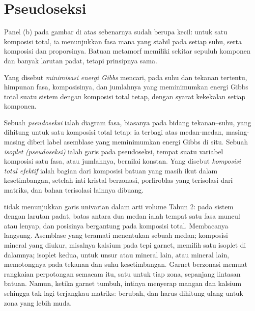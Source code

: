 \section{Pseudoseksi}\label{sec:b3:petrological-thermodynamics:pseudosections}

Panel (b) pada gambar di atas sebenarnya sudah berupa  kecil: untuk satu
komposisi total, ia menunjukkan fasa mana yang stabil pada setiap suhu, serta
komposisi dan proporsinya. Batuan metamorf memiliki sekitar sepuluh
komponen dan banyak larutan padat, tetapi prinsipnya sama.

\begin{definition}\label{def:b3:petrological-thermodynamics:minimisation}
Yang disebut \emph{minimisasi energi Gibbs} mencari, pada suhu dan
tekanan tertentu, himpunan fasa, komposisinya, dan
jumlahnya yang meminimumkan energi Gibbs total suatu sistem dengan komposisi total
tetap, dengan syarat kekekalan setiap komponen.
\end{definition}

\begin{definition}\label{def:b3:petrological-thermodynamics:pseudosection}
Sebuah \emph{pseudoseksi} ialah diagram fasa, biasanya pada bidang
tekanan--suhu, yang dihitung untuk satu komposisi total tetap: ia
terbagi atas medan-medan, masing-masing diberi label asemblase yang meminimumkan
energi Gibbs di situ. Sebuah \emph{isoplet (pseudoseksi)}
ialah garis pada pseudoseksi, tempat suatu variabel komposisi
satu fasa, atau jumlahnya, bernilai konstan. Yang disebut \emph{komposisi total
efektif} ialah bagian dari komposisi batuan yang
masih ikut dalam kesetimbangan, setelah inti kristal berzonasi,
porfiroblas yang terisolasi dari matriks, dan bahan terisolasi lainnya
dibuang.
\end{definition}

 tidak menunjukkan garis univarian dalam arti
volume Tahun 2: pada sistem dengan larutan padat, batas antara dua medan
ialah tempat satu fasa muncul atau lenyap, dan posisinya bergantung pada
komposisi total. Membacanya langsung. Asemblase yang teramati menentukan sebuah medan;
komposisi mineral yang diukur, misalnya kalsium pada tepi garnet,
memilih satu isoplet di dalamnya; isoplet kedua, untuk unsur atau mineral lain,
atau mineral lain, memotongnya pada tekanan dan suhu
kesetimbangan. Garnet berzonasi memuat rangkaian perpotongan semacam itu, satu untuk tiap
zona, sepanjang lintasan batuan. Namun, ketika garnet tumbuh, intinya menyerap
mangan dan kalsium sehingga tak lagi terjangkau matriks: 
berubah, dan  harus dihitung ulang untuk
zona yang lebih muda.


